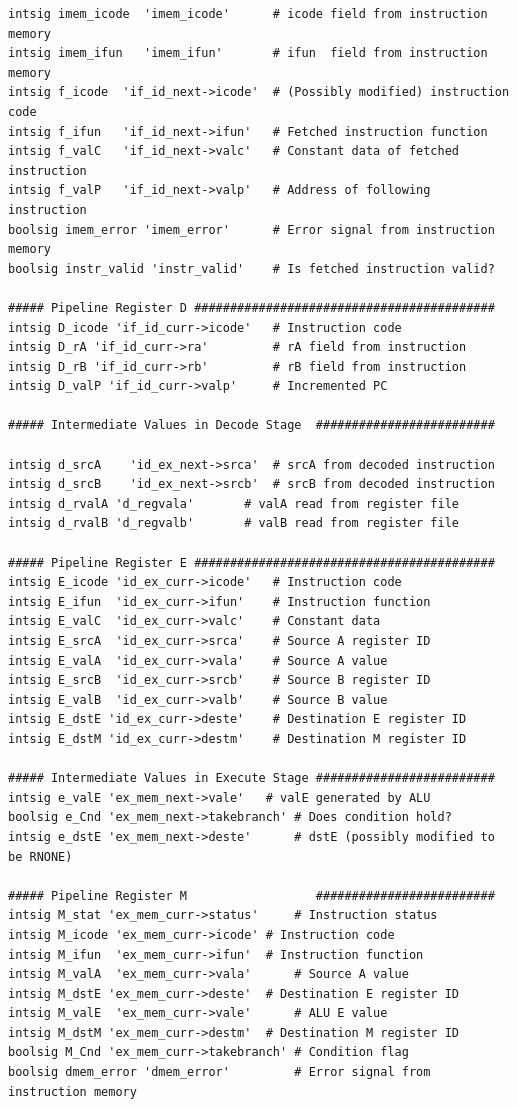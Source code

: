 \documentclass{article}
\begin{document}
\begin{itemize}
\begin{lstlisting}[caption={}]
intsig imem_icode  'imem_icode'      # icode field from instruction memory
intsig imem_ifun   'imem_ifun'       # ifun  field from instruction memory
intsig f_icode	'if_id_next->icode'  # (Possibly modified) instruction code
intsig f_ifun	'if_id_next->ifun'   # Fetched instruction function
intsig f_valC	'if_id_next->valc'   # Constant data of fetched instruction
intsig f_valP	'if_id_next->valp'   # Address of following instruction
boolsig imem_error 'imem_error'	     # Error signal from instruction memory
boolsig instr_valid 'instr_valid'    # Is fetched instruction valid?

##### Pipeline Register D ##########################################
intsig D_icode 'if_id_curr->icode'   # Instruction code
intsig D_rA 'if_id_curr->ra'	     # rA field from instruction
intsig D_rB 'if_id_curr->rb'	     # rB field from instruction
intsig D_valP 'if_id_curr->valp'     # Incremented PC

##### Intermediate Values in Decode Stage  #########################

intsig d_srcA	 'id_ex_next->srca'  # srcA from decoded instruction
intsig d_srcB	 'id_ex_next->srcb'  # srcB from decoded instruction
intsig d_rvalA 'd_regvala'	     # valA read from register file
intsig d_rvalB 'd_regvalb'	     # valB read from register file

##### Pipeline Register E ##########################################
intsig E_icode 'id_ex_curr->icode'   # Instruction code
intsig E_ifun  'id_ex_curr->ifun'    # Instruction function
intsig E_valC  'id_ex_curr->valc'    # Constant data
intsig E_srcA  'id_ex_curr->srca'    # Source A register ID
intsig E_valA  'id_ex_curr->vala'    # Source A value
intsig E_srcB  'id_ex_curr->srcb'    # Source B register ID
intsig E_valB  'id_ex_curr->valb'    # Source B value
intsig E_dstE 'id_ex_curr->deste'    # Destination E register ID
intsig E_dstM 'id_ex_curr->destm'    # Destination M register ID

##### Intermediate Values in Execute Stage #########################
intsig e_valE 'ex_mem_next->vale'	# valE generated by ALU
boolsig e_Cnd 'ex_mem_next->takebranch' # Does condition hold?
intsig e_dstE 'ex_mem_next->deste'      # dstE (possibly modified to be RNONE)

##### Pipeline Register M                  #########################
intsig M_stat 'ex_mem_curr->status'     # Instruction status
intsig M_icode 'ex_mem_curr->icode'	# Instruction code
intsig M_ifun  'ex_mem_curr->ifun'	# Instruction function
intsig M_valA  'ex_mem_curr->vala'      # Source A value
intsig M_dstE 'ex_mem_curr->deste'	# Destination E register ID
intsig M_valE  'ex_mem_curr->vale'      # ALU E value
intsig M_dstM 'ex_mem_curr->destm'	# Destination M register ID
boolsig M_Cnd 'ex_mem_curr->takebranch'	# Condition flag
boolsig dmem_error 'dmem_error'	        # Error signal from instruction memory


\end{lstlisting}
\end{itemize}
\end{document}
